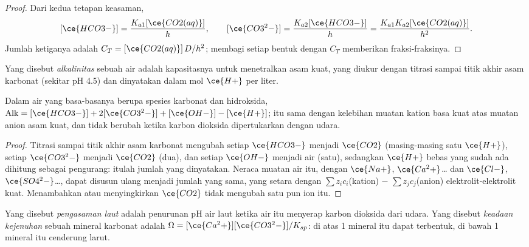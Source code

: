 \begin{proof}
Dari kedua tetapan keasaman,
\[
  [\ce{HCO3-}] = \frac{K_{a1}[\ce{CO2(aq)}]}{h}, \qquad [\ce{CO3^2-}] = \frac{K_{a2}[\ce{HCO3-}]}{h} = \frac{K_{a1}K_{a2}[\ce{CO2(aq)}]}{h^2}.
\]
Jumlah ketiganya adalah $C_T = [\ce{CO2(aq)}]\,D/h^2$; membagi setiap bentuk dengan $C_T$ memberikan fraksi-fraksinya.
\end{proof}

\begin{definition}[Alkalinitas]\label{def:b3:environmental-toxicology:alkalinity}
Yang disebut \emph{alkalinitas} sebuah air adalah kapasitasnya untuk menetralkan
asam kuat, yang diukur dengan titrasi sampai titik akhir asam karbonat (sekitar pH
4.5) dan dinyatakan dalam mol $\ce{H+}$ per liter.
\end{definition}

\begin{proposition}\label{prop:b3:environmental-toxicology:alkalinity}
Dalam air yang basa-basanya berupa spesies karbonat dan hidroksida,
$\mathrm{Alk} = [\ce{HCO3-}] + 2[\ce{CO3^2-}] + [\ce{OH-}] - [\ce{H+}]$;  itu sama dengan kelebihan muatan kation basa kuat
atas muatan anion asam kuat, dan tidak berubah ketika karbon dioksida
dipertukarkan dengan udara.
\end{proposition}

\begin{proof}
Titrasi sampai titik akhir asam karbonat mengubah setiap $\ce{HCO3-}$ menjadi $\ce{CO2}$ (masing-masing satu $\ce{H+}$),
setiap $\ce{CO3^2-}$ menjadi $\ce{CO2}$ (dua), dan setiap $\ce{OH-}$ menjadi air (satu), sedangkan $\ce{H+}$ bebas yang sudah ada
dihitung sebagai pengurang: itulah jumlah yang dinyatakan. Neraca muatan air itu, dengan
$\ce{Na+}$, $\ce{Ca^2+}$\dots{} dan $\ce{Cl-}$, $\ce{SO4^2-}$\dots, dapat disusun ulang menjadi jumlah yang sama, yang setara dengan $\sum z_i c_i$(kation) $-$ $\sum z_jc_j$(anion)
elektrolit-elektrolit kuat. Menambahkan atau menyingkirkan $\ce{CO2}$ tidak mengubah satu pun ion itu.
\end{proof}

\begin{definition}\label{def:b3:environmental-toxicology:acidification}
Yang disebut \emph{pengasaman laut} adalah penurunan
pH air laut ketika air itu menyerap karbon dioksida dari udara. Yang disebut \emph{keadaan
kejenuhan} sebuah mineral karbonat adalah
$\Omega = [\ce{Ca^2+}][\ce{CO3^2-}]/K_{sp}$: di atas 1 mineral itu dapat terbentuk, di bawah 1 mineral itu cenderung larut.
\end{definition}

